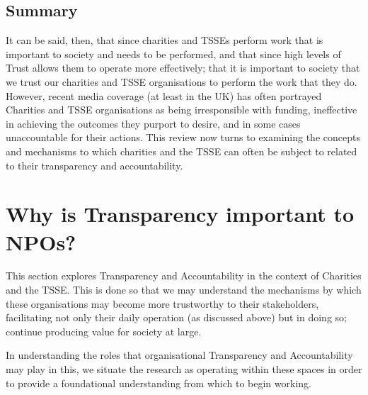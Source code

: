 \subsection{Summary}
It can be said, then, that since charities and TSSEs perform work that is important to society and needs to be performed, and that since high levels of Trust allows them to operate more effectively; that it is important to society that we trust our charities and TSSE organisations to perform the work that they do. However, recent media coverage (at least in the UK) has often portrayed Charities and TSSE organisations as being irresponsible with funding, ineffective in achieving the outcomes they purport to desire, and in some cases unaccountable for their actions. This review now turns to examining the concepts and mechanisms to which charities and the TSSE can often be subject to related to their transparency and accountability.

\section{Why is Transparency important to NPOs?}


This section explores Transparency and Accountability in the context of Charities and the TSSE. This is done so that we may understand the mechanisms by which these organisations may become more trustworthy to their stakeholders, facilitating not only their daily operation (as discussed above) but in doing so; continue producing value for society at large.

In understanding the roles that organisational Transparency and Accountability may play in this, we situate the research as operating within these spaces in order to provide a foundational understanding from which to begin working.

